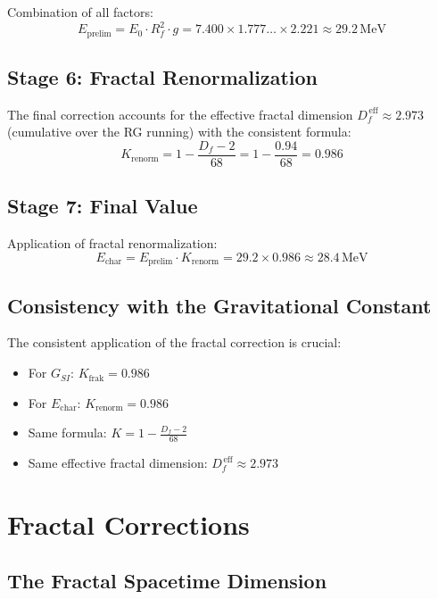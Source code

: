 	Combination of all factors:
	\begin{equation}
		E_{\text{prelim}} = E_0 \cdot R_f^2 \cdot g = 7.400 \times 1.777\ldots \times 2.221 \approx 29.2\,\text{MeV}
	\end{equation}
	
	\subsection{Stage 6: Fractal Renormalization}
	
	The final correction accounts for the effective fractal dimension $D_f^{\,\text{eff}} \approx 2.973$ (cumulative over the RG running) with the consistent formula:
	\begin{equation}
		K_{\text{renorm}} = 1 - \frac{D_f - 2}{68} = 1 - \frac{0.94}{68} = 0.986
	\end{equation}
	
	\subsection{Stage 7: Final Value}
	
	Application of fractal renormalization:
	\begin{equation}
		E_{\text{char}} = E_{\text{prelim}} \cdot K_{\text{renorm}} = 29.2 \times 0.986 \approx 28.4\,\text{MeV}
	\end{equation}
	
	\subsection{Consistency with the Gravitational Constant}
	
	The consistent application of the fractal correction is crucial:
	\begin{itemize}
		\item For $G_{SI}$: $K_{\text{frak}} = 0.986$
		\item For $E_{\text{char}}$: $K_{\text{renorm}} = 0.986$
		\item Same formula: $K = 1 - \frac{D_f - 2}{68}$
		\item Same effective fractal dimension: $D_f^{\,\text{eff}} \approx 2.973$
	\end{itemize}
	
	\section{Fractal Corrections}
	
	\subsection{The Fractal Spacetime Dimension}
	
